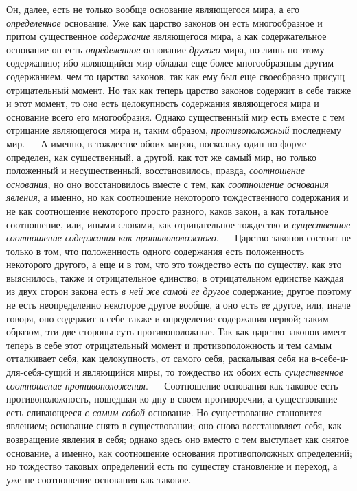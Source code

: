 Он, далее, есть не только вообще основание являющегося мира, а его
{\em определенное} основание. Уже как царство законов
он есть многообразное и притом существенное
{\em содержание} являющегося мира, а как содержательное
основание он есть {\em определенное} основание
{\em другого} мира, но лишь по этому содержанию; ибо
являющийся мир обладал еще более многообразным другим содержанием, чем то
царство законов, так как ему был еще своеобразно присущ отрицательный
момент. Но так как теперь царство законов содержит в себе также и этот
момент, то оно есть целокупность содержания являющегося мира и основание
всего его многообразия. Однако существенный мир есть вместе с тем отрицание
являющегося мира и, таким образом,
{\em противоположный} последнему мир. — А именно, в
тождестве обоих миров, поскольку один по форме определен, как существенный,
а другой, как тот же самый мир, но только положенный и несущественный,
восстановилось, правда, {\em соотношение основания}, но
оно восстановилось вместе с тем, как {\em соотношение
основания явления}, а именно, но как соотношение некоторого тождественного
содержания и не как соотношение некоторого просто разного, каков закон, а
как тотальное соотношение, или, иными словами, как отрицательное тождество
и {\em существенное соотношение содержания как
противоположного}. — Царство законов состоит не только в том, что
положенность одного содержания есть положенность некоторого другого, а еще
и в том, что это тождество есть по существу, как это выяснилось, также и
отрицательное единство; в отрицательном единстве каждая из двух сторон
закона есть {\em в ней же самой ее другое} содержание;
другое поэтому не есть неопределенно некоторое другое вообще, а оно есть
{\em ее} другое, или, иначе говоря, оно содержит в себе
также и определение содержания первой; таким образом, эти две стороны суть
противоположные. Так как царство законов имеет теперь в себе этот
отрицательный момент и противоположность и тем самым отталкивает себя, как
целокупность, от самого себя, раскалывая себя на в-себе-и-для-себя-сущий и
являющийся миры, то тождество их обоих есть
{\em существенное соотношение противоположения}. —
Соотношение основания как таковое есть противоположность, пошедшая ко дну в
своем противоречии, а существование есть сливающееся
{\em с самим собой} основание. Но существование
становится явлением; основание снято в существовании; оно снова
восстановляет себя, как возвращение явления в себя; однако здесь оно вместо
с тем выступает как снятое основание, а именно, как соотношение основания
противоположных определений; но тождество таковых определений есть по
существу становление и переход, а уже не соотношение основания как таковое.

